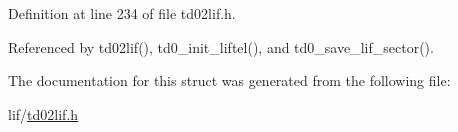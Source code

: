 Definition at line 234 of file td02lif.\+h.



Referenced by td02lif(), td0\+\_\+init\+\_\+liftel(), and td0\+\_\+save\+\_\+lif\+\_\+sector().



The documentation for this struct was generated from the following file\+:\begin{DoxyCompactItemize}
\item 
lif/\hyperlink{td02lif_8h}{td02lif.\+h}\end{DoxyCompactItemize}
